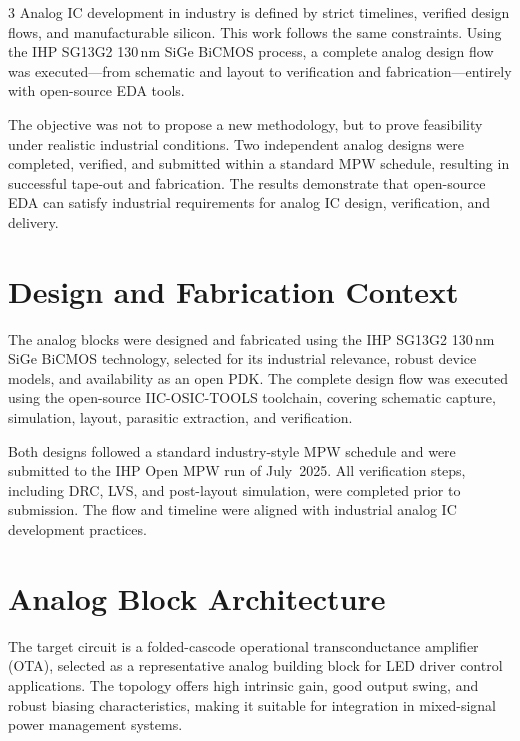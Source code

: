 \documentclass[a0,portrait,ruledsections]{sciposter}
\begin{document}
\begin{multicols}{3}
Analog IC development in industry is defined by strict timelines, verified
design flows, and manufacturable silicon. This work follows the same
constraints. Using the IHP SG13G2 130\,nm SiGe BiCMOS process, a complete
analog design flow was executed—from schematic and layout to verification
and fabrication—entirely with open-source EDA tools.

The objective was not to propose a new methodology, but to prove feasibility
under realistic industrial conditions. Two independent analog designs were
completed, verified, and submitted within a standard MPW schedule, resulting
in successful tape-out and fabrication. The results demonstrate that
open-source EDA can satisfy industrial requirements for analog IC design,
verification, and delivery.



\section{Design and Fabrication Context}

The analog blocks were designed and fabricated using the IHP SG13G2
130\,nm SiGe BiCMOS technology, selected for its industrial relevance,
robust device models, and availability as an open PDK. The complete
design flow was executed using the open-source IIC-OSIC-TOOLS toolchain,
covering schematic capture, simulation, layout, parasitic extraction,
and verification.

Both designs followed a standard industry-style MPW schedule and were
submitted to the IHP Open MPW run of July~2025. All verification steps,
including DRC, LVS, and post-layout simulation, were completed prior to
submission. The flow and timeline were aligned with industrial analog IC
development practices.


\section{Analog Block Architecture}

The target circuit is a folded-cascode operational transconductance
amplifier (OTA), selected as a representative analog building block for
LED driver control applications. The topology offers high intrinsic gain,
good output swing, and robust biasing characteristics, making it suitable
for integration in mixed-signal power management systems.


\end{multicols}
\end{document}
